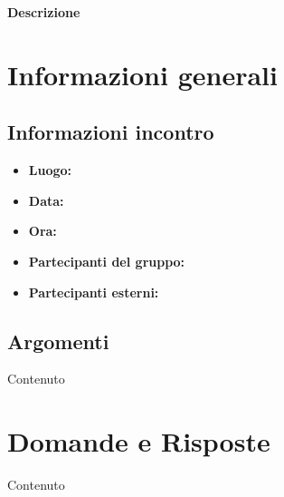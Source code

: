 \documentclass[a4paper, oneside, openany]{article}
\begin{document}
\begin{titlepage}
\begin{center}
        \vspace{1cm}

		\begin{center}
			\textbf{Descrizione\\}
			\DescrizioneDoc
		\end{center}
		
	\end{center}
\end{titlepage}

\restoregeometry
	
	\section{Informazioni generali}
		\subsection{Informazioni incontro}
			\begin{itemize}
				\item { \textbf{Luogo:}  }
				\item { \textbf{Data:} }
				\item { \textbf{Ora:} }
				\item { \textbf{Partecipanti del gruppo:} }
				\item { \textbf{Partecipanti esterni:} }
			\end{itemize}
		
        \subsection{Argomenti}
            Contenuto

	\section{Domande e Risposte}
            Contenuto
\end{document}
